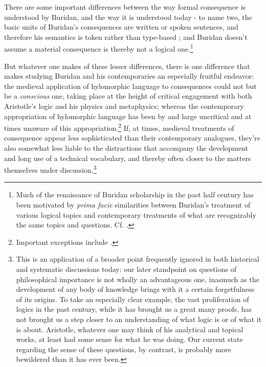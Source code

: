 			There are some important differences between the way formal consequence is understood by Buridan, and the way it is understood today - to name two, the basic units of Buridan's consequences are written or spoken sentences, and therefore his semantics is token rather than type-based \cite{Klima2004} \cite{DutilhNovaes2005}; and Buridan doesn't assume a material consequence is thereby not a logical one.\footnote{Much of the renaissance of Buridan scholarship in the past half century has been motivated by \textit{prima facie} similarities between Buridan's treatment of various logical topics and contemporary treatments of what are recognizably the same topics and questions. Cf. \cite{Moody1952} \cite{Bochenski1956} \cite{Kretzmann1982} \cite{Parsons2014}.}
			
			But whatever one makes of these lesser differences, there is one difference that makes studying Buridan and his contemporaries an especially fruitful endeavor: the medieval application of hylomorphic language to consequences could not but be a \textit{conscious} one, taking place at the height of critical engagement with both Aristotle's logic and his physics and metaphysics; whereas the contemporary appropriation of hylomorphic language has been by and large uncritical and at times unaware of this appropriation.\footnote{Important exceptions include \cite{Read1994} \cite{Read1995} \cite{MacFarlane2000} \cite{DutilhNovaes2011} \cite{DutilhNovaes2012a} \cite{DutilhNovaes2012b} \cite{DutilhNovaes2012c}.} If, at times, medieval treatments of consequence appear less sophisticated than their contemporary analogues, they're also somewhat less liable to the distractions that accompany the development and long use of a technical vocabulary, and thereby often closer to the matters themselves under discussion.\footnote{This is an application of a broader point frequently ignored in both historical and systematic discussions today: our later standpoint on questions of philosophical importance is not wholly an advantageous one, inasmuch as the development of any body of knowledge brings with it a certain forgetfulness of its origins. To take an especially clear example, the vast proliferation of logics in the past century, while it has brought us a great many proofs, has not brought us a step closer to an understanding of what logic is or of what it is about. Aristotle, whatever one may think of his analytical and topical works, at least had some sense for what he was doing. Our current state regarding the sense of these questions, by contrast, is probably more bewildered than it has ever been.}
			
